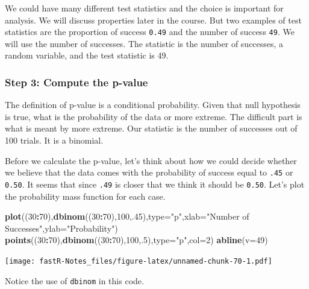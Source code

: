 \documentclass[]{book}
\newenvironment{Shaded}{\begin{snugshade}}{\end{snugshade}}
\newcommand{\KeywordTok}[1]{\textcolor[rgb]{0.13,0.29,0.53}{\textbf{#1}}}
\newcommand{\DataTypeTok}[1]{\textcolor[rgb]{0.13,0.29,0.53}{#1}}
\newcommand{\DecValTok}[1]{\textcolor[rgb]{0.00,0.00,0.81}{#1}}
\newcommand{\StringTok}[1]{\textcolor[rgb]{0.31,0.60,0.02}{#1}}
\newcommand{\OperatorTok}[1]{\textcolor[rgb]{0.81,0.36,0.00}{\textbf{#1}}}
\newcommand{\NormalTok}[1]{#1}
\theoremstyle{definition}
\theoremstyle{definition}
\theoremstyle{definition}
\theoremstyle{remark}
\begin{document}
We could have many different test statistics and the choice is important
for analysis. We will discuss properties later in the course. But two
examples of test statistics are the proportion of success \texttt{0.49}
and the number of success \texttt{49}. We will use the number of
successes. The statistic is the number of successes, a random variable,
and the test statistic is 49.

\subsubsection{Step 3: Compute the
p-value}\label{step-3-compute-the-p-value}

The definition of p-value is a conditional probability. Given that null
hypothesis is true, what is the probability of the data or more extreme.
The difficult part is what is meant by more extreme. Our statistic is
the number of successes out of 100 trials. It is a binomial.

Before we calculate the p-value, let's think about how we could decide
whether we believe that the data comes with the probability of success
equal to \texttt{.45} or \texttt{0.50}. It seems that since \texttt{.49}
is closer that we think it should be \texttt{0.50}. Let's plot the
probability mass function for each case.

\begin{Shaded}
\begin{Highlighting}[]
\KeywordTok{plot}\NormalTok{((}\DecValTok{30}\OperatorTok{:}\DecValTok{70}\NormalTok{),}\KeywordTok{dbinom}\NormalTok{((}\DecValTok{30}\OperatorTok{:}\DecValTok{70}\NormalTok{),}\DecValTok{100}\NormalTok{,.}\DecValTok{45}\NormalTok{),}\DataTypeTok{type=}\StringTok{"p"}\NormalTok{,}\DataTypeTok{xlab=}\StringTok{"Number of Successes"}\NormalTok{,}\DataTypeTok{ylab=}\StringTok{"Probability"}\NormalTok{)}
\KeywordTok{points}\NormalTok{((}\DecValTok{30}\OperatorTok{:}\DecValTok{70}\NormalTok{),}\KeywordTok{dbinom}\NormalTok{((}\DecValTok{30}\OperatorTok{:}\DecValTok{70}\NormalTok{),}\DecValTok{100}\NormalTok{,.}\DecValTok{5}\NormalTok{),}\DataTypeTok{type=}\StringTok{"p"}\NormalTok{,}\DataTypeTok{col=}\DecValTok{2}\NormalTok{)}
\KeywordTok{abline}\NormalTok{(}\DataTypeTok{v=}\DecValTok{49}\NormalTok{)}
\end{Highlighting}
\end{Shaded}

\texttt{[image: fastR-Notes\_files/figure-latex/unnamed-chunk-70-1.pdf]}

Notice the use of \texttt{dbinom} in this code.
\end{document}

